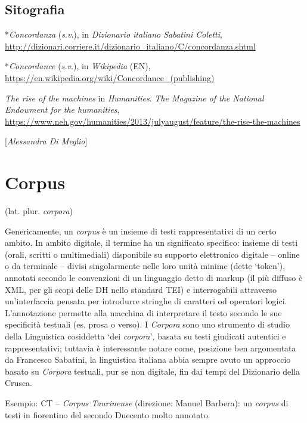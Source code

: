 \section*{Sitografia}
{\parindent0pt 
*\emph{Concordanza} (\emph{s}.\emph{v}.), in \emph{Dizionario italiano
Sabatini Coletti},
\url{http://dizionari.corriere.it/dizionario_italiano/C/concordanza.shtml}

*\emph{Concordance} (\emph{s.v}.), in \emph{Wikipedia} (EN),
\url{https://en.wikipedia.org/wiki/Concordance_(publishing)}

\emph{The rise of the} \emph{machines} in \emph{Humanities}. \emph{The
Magazine of the National Endowment for the humanities},
\url{https://www.neh.gov/humanities/2013/julyaugust/feature/the-rise-the-machines}
}

\hrulefill 

{[}\emph{Alessandra Di Meglio}{]}


\chapter{Corpus}

(lat. plur. \emph{corpora})

Genericamente, un \emph{corpus} è un insieme di testi rappresentativi di
un certo ambito. In ambito digitale, il termine ha un significato
specifico: insieme di testi (orali, scritti o multimediali) disponibile
su supporto elettronico digitale -- online o da terminale -- divisi
singolarmente nelle loro unità minime (dette `token'), annotati secondo
le convenzioni di un linguaggio detto di markup (il più diffuso è XML,
per gli scopi delle DH nello standard TEI) e interrogabili attraverso
un'interfaccia pensata per introdurre stringhe di caratteri od operatori
logici. L'annotazione permette alla macchina di interpretare il testo
secondo le sue specificità testuali (es. prosa o verso). I
\emph{Corpora} sono uno strumento di studio della Linguistica cosiddetta
`dei \emph{corpora}'\emph{,} basata su testi giudicati autentici e
rappresentativi; tuttavia è interessante notare come, posizione ben
argomentata da Francesco Sabatini, la linguistica italiana abbia sempre
avuto un approccio basato su \emph{Corpora} testuali, pur se non
digitale, fin dai tempi del Dizionario della Crusca.

Esempio: CT -- \emph{Corpus Taurinense} (direzione: Manuel Barbera): un
\emph{corpus} di testi in fiorentino del secondo Duecento molto
annotato.

\hrulefill 

